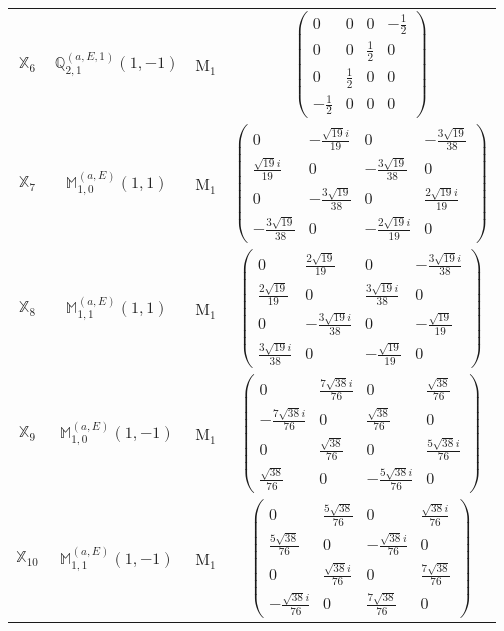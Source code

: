 \documentclass[fleqn,10pt,landscape]{article}
\begin{document}
\begin{itemize}
\begin{center}
\begin{longtable}{c|c|c|c}
$ \mathbb{X}_{6} $ & $\mathbb{Q}_{2,1}^{(a,E,1)}(1,-1)$ & M$_{1}$ & $\begin{pmatrix} 0 & 0 & 0 & - \frac{1}{2} \\ 0 & 0 & \frac{1}{2} & 0 \\ 0 & \frac{1}{2} & 0 & 0 \\ - \frac{1}{2} & 0 & 0 & 0 \end{pmatrix}$ \\
$ \mathbb{X}_{7} $ & $\mathbb{M}_{1,0}^{(a,E)}(1,1)$ & M$_{1}$ & $\begin{pmatrix} 0 & - \frac{\sqrt{19} i}{19} & 0 & - \frac{3 \sqrt{19}}{38} \\ \frac{\sqrt{19} i}{19} & 0 & - \frac{3 \sqrt{19}}{38} & 0 \\ 0 & - \frac{3 \sqrt{19}}{38} & 0 & \frac{2 \sqrt{19} i}{19} \\ - \frac{3 \sqrt{19}}{38} & 0 & - \frac{2 \sqrt{19} i}{19} & 0 \end{pmatrix}$ \\
$ \mathbb{X}_{8} $ & $\mathbb{M}_{1,1}^{(a,E)}(1,1)$ & M$_{1}$ & $\begin{pmatrix} 0 & \frac{2 \sqrt{19}}{19} & 0 & - \frac{3 \sqrt{19} i}{38} \\ \frac{2 \sqrt{19}}{19} & 0 & \frac{3 \sqrt{19} i}{38} & 0 \\ 0 & - \frac{3 \sqrt{19} i}{38} & 0 & - \frac{\sqrt{19}}{19} \\ \frac{3 \sqrt{19} i}{38} & 0 & - \frac{\sqrt{19}}{19} & 0 \end{pmatrix}$ \\
$ \mathbb{X}_{9} $ & $\mathbb{M}_{1,0}^{(a,E)}(1,-1)$ & M$_{1}$ & $\begin{pmatrix} 0 & \frac{7 \sqrt{38} i}{76} & 0 & \frac{\sqrt{38}}{76} \\ - \frac{7 \sqrt{38} i}{76} & 0 & \frac{\sqrt{38}}{76} & 0 \\ 0 & \frac{\sqrt{38}}{76} & 0 & \frac{5 \sqrt{38} i}{76} \\ \frac{\sqrt{38}}{76} & 0 & - \frac{5 \sqrt{38} i}{76} & 0 \end{pmatrix}$ \\
$ \mathbb{X}_{10} $ & $\mathbb{M}_{1,1}^{(a,E)}(1,-1)$ & M$_{1}$ & $\begin{pmatrix} 0 & \frac{5 \sqrt{38}}{76} & 0 & \frac{\sqrt{38} i}{76} \\ \frac{5 \sqrt{38}}{76} & 0 & - \frac{\sqrt{38} i}{76} & 0 \\ 0 & \frac{\sqrt{38} i}{76} & 0 & \frac{7 \sqrt{38}}{76} \\ - \frac{\sqrt{38} i}{76} & 0 & \frac{7 \sqrt{38}}{76} & 0 \end{pmatrix}$ \\

\end{longtable}
\end{center}
\end{itemize}
\end{document}
